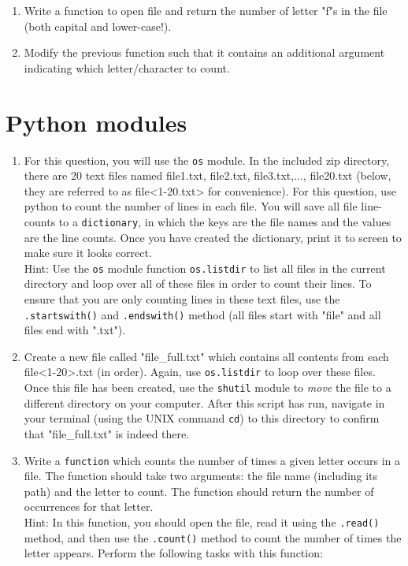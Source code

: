 \documentclass{article}[12pt]
\newcommand{\code}[1]{\texttt{#1}}  %
\begin{document}
\begin{enumerate}
	\item Write a function to open file and return the number of letter "f"\textquotesingle s in the file (both capital and lower-case!). 

	\item Modify the previous function such that it contains an additional argument indicating which letter/character to count.
	
\end{enumerate}


\section{Python modules}
\begin{enumerate}
	
	\item For this question, you will use the \code{os} module. In the included zip directory, there are 20 text files named file1.txt, file2.txt, file3.txt,..., file20.txt (below, they are referred to as file<1-20.txt> for convenience). For this question, use python to count the number of lines in each file. You will save all file line-counts to a \code{dictionary}, in which the keys are the file names and the values are the line counts. Once you have created the dictionary, print it to screen to make sure it looks correct.
	\\ Hint: Use the \code{os} module function \code{os.listdir} to list all files in the current directory and loop over all of these files in order to count their lines. To ensure that you are only counting lines in these text files, use the \code{.startswith()} and \code{.endswith()} method (all files start with "file" and all files end with ".txt").

	\item Create a new file called "file\_full.txt" which contains all contents from each file<1-20>.txt (in order). Again, use \code{os.listdir} to loop over these files. Once this file has been created, use the \code{shutil} module to \emph{move} the file to a different directory on your computer. After this script has run, navigate in your terminal (using the UNIX command \code{cd}) to this directory to confirm that "file\_full.txt" is indeed there.

	\item  Write a \code{function} which counts the number of times a given letter occurs in a file. The function should take two arguments: the file name (including its path) and the letter to count. The function should return the number of occurrences for that letter. \\Hint: In this function, you should open the file, read it using the \code{.read()} method, and then use the \code{.count()} method to count the number of times the letter appears. Perform the following tasks with this function:
	

\end{enumerate}
\end{document}
